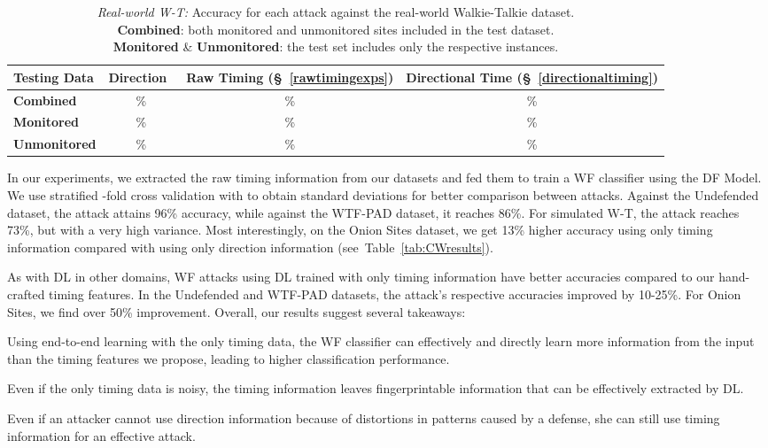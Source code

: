 \documentclass[USenglish,oneside,twocolumn]{article}
\newenvironment{smitemize}
  {\begin{list}{--}
     {\setlength{\parsep}{0pt}
      \setlength{\leftmargin}{15pt}
      \setlength{\topsep}{-2pt}
      \setlength{\labelwidth}{5pt}
      \setlength{\itemsep}{1pt}}}
  {\end{list}}
\begin{document}
\begin{table*}[th!]
\renewcommand{\arraystretch}{1.25}
  \begin{center}\vskip -0.3cm  
\caption{\emph{Real-world W-T:} Accuracy for each attack against the real-world Walkie-Talkie dataset.\\
\label{tab:wt-real}
\textbf{Combined}: both monitored and unmonitored sites included in the test dataset. \\
\textbf{Monitored} \& \textbf{Unmonitored}: the test set includes only the respective instances.}
\begin{tabular}{l c c c}
\textbf{Testing Data}         & \textbf{Direction}~\cite{Sirinam2018} & \textbf{Raw Timing} (\S~\ref{rawtimingexps}) & \textbf{Directional Time} (\S~\ref{directionaltiming})\\ \hline


\textbf{Combined}      & \%     & \%      & \%            \\
\textbf{Monitored}    & \%     & \%      & \%            \\
\textbf{Unmonitored} & \%      & \%      & \%            \\  \hline
\end{tabular}
\end{center}
\end{table*}

%
 
In our experiments, we extracted the raw timing information from our datasets and fed them to train a WF classifier using the DF Model. We use stratified -fold cross validation with  to obtain standard deviations for better comparison between attacks. Against the Undefended dataset, the attack attains 96\% accuracy, while against the WTF-PAD dataset, it reaches 86\%. For simulated W-T, the attack reaches 73\%, but with a very high variance. Most interestingly, on the Onion Sites dataset, we get 13\% higher accuracy using only timing information compared with using only direction information (see~Table~\ref{tab:CWresults}).

As with DL in other domains, WF attacks using DL trained with only timing information have better accuracies compared to our hand-crafted timing features. In the Undefended and WTF-PAD datasets, the attack's respective accuracies improved by 10-25\%. For Onion Sites, we find over 50\% improvement. Overall, our results suggest several takeaways:
~\begin{smitemize}
    \item Using end-to-end learning with the only timing data, the WF classifier can effectively and directly learn more information from the input than the timing features we propose, leading to higher classification performance. 
    \item Even if the only timing data is noisy, the timing information leaves fingerprintable information that can be effectively extracted by DL.
    \item Even if an attacker cannot use direction information because of distortions in patterns caused by a defense, she can still use timing information for an effective attack.
\end{smitemize}
\end{document}
